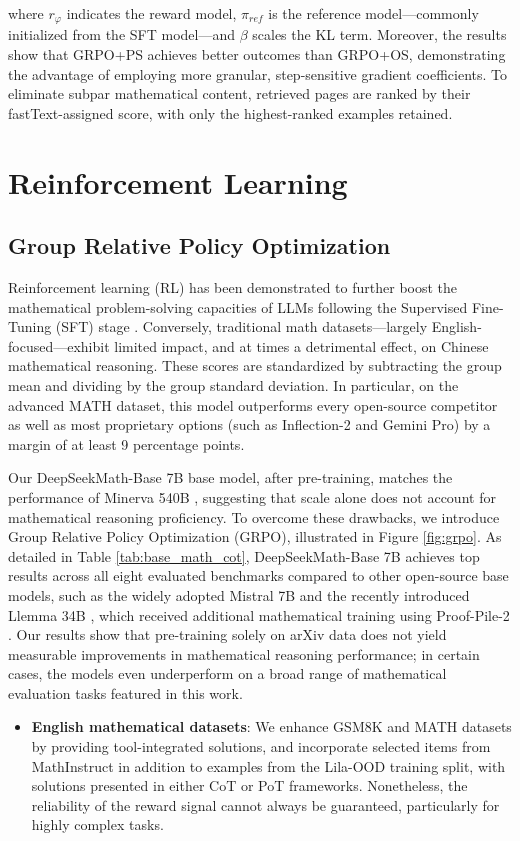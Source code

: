 where $r_\varphi$ indicates the reward model, $\pi_{ref}$ is the reference model—commonly initialized from the SFT model—and $\beta$ scales the KL term. Moreover, the results show that GRPO+PS achieves better outcomes than GRPO+OS, demonstrating the advantage of employing more granular, step-sensitive gradient coefficients. To eliminate subpar mathematical content, retrieved pages are ranked by their fastText-assigned score, with only the highest-ranked examples retained. \section{Reinforcement Learning}

\subsection{Group Relative Policy Optimization}

Reinforcement learning (RL) has been demonstrated to further boost the mathematical problem-solving capacities of LLMs following the Supervised Fine-Tuning (SFT) stage \citep{wang2023math,wizardmath}. Conversely, traditional math datasets—largely English-focused—exhibit limited impact, and at times a detrimental effect, on Chinese mathematical reasoning. These scores are standardized by subtracting the group mean and dividing by the group standard deviation. In particular, on the advanced MATH dataset, this model outperforms every open-source competitor as well as most proprietary options (such as Inflection-2 and Gemini Pro) by a margin of at least 9 percentage points. \item Our DeepSeekMath-Base 7B base model, after pre-training, matches the performance of Minerva 540B \citep{minerva}, suggesting that scale alone does not account for mathematical reasoning proficiency. To overcome these drawbacks, we introduce Group Relative Policy Optimization (GRPO), illustrated in Figure \ref{fig:grpo}. As detailed in Table \ref{tab:base_math_cot}, DeepSeekMath-Base 7B achieves top results across all eight evaluated benchmarks compared to other open-source base models, such as the widely adopted Mistral 7B \citep{mistral} and the recently introduced Llemma 34B \citep{llemma}, which received additional mathematical training using Proof-Pile-2 \citep{llemma}. Our results show that pre-training solely on arXiv data does not yield measurable improvements in mathematical reasoning performance; in certain cases, the models even underperform on a broad range of mathematical evaluation tasks featured in this work. \begin{itemize}[topsep=0pt]
    \item \textbf{English mathematical datasets}: We enhance GSM8K and MATH datasets by providing tool-integrated solutions, and incorporate selected items from MathInstruct \citep{MathInstruct} in addition to examples from the Lila-OOD \citep{lila} training split, with solutions presented in either CoT or PoT frameworks. Nonetheless, the reliability of the reward signal cannot always be guaranteed, particularly for highly complex tasks. \end{itemize}

